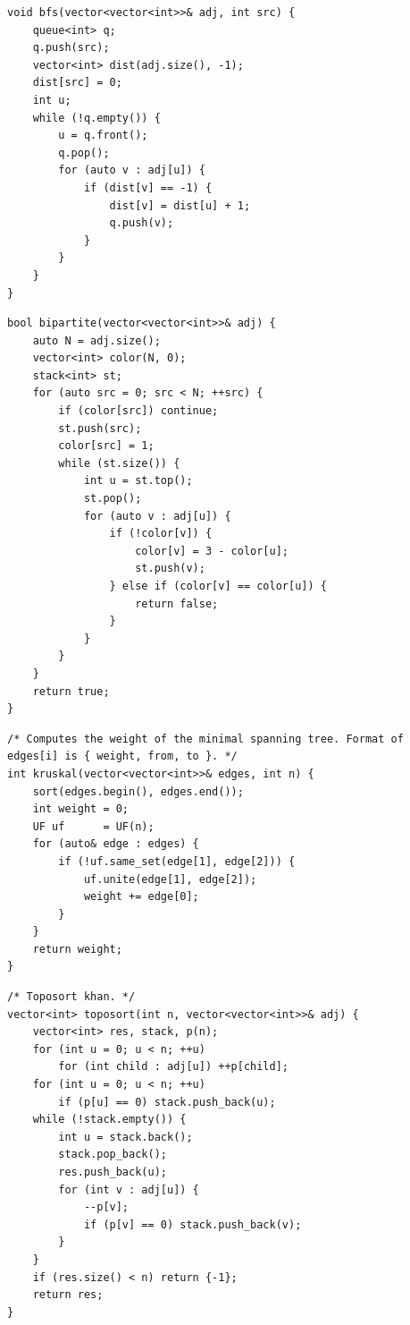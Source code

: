 \documentclass[a4paper,10pt]{article}
\newenvironment{keepfunction}{\begin{samepage}}{\end{samepage}}
\begin{document}
\begin{keepfunction}
\begin{verbatim}
void bfs(vector<vector<int>>& adj, int src) {
    queue<int> q;
    q.push(src);
    vector<int> dist(adj.size(), -1);
    dist[src] = 0;
    int u;
    while (!q.empty()) {
        u = q.front();
        q.pop();
        for (auto v : adj[u]) {
            if (dist[v] == -1) {
                dist[v] = dist[u] + 1;
                q.push(v);
            }
        }
    }
}
\end{verbatim}
\end{keepfunction}

\begin{keepfunction}
\begin{verbatim}
bool bipartite(vector<vector<int>>& adj) {
    auto N = adj.size();
    vector<int> color(N, 0);
    stack<int> st;
    for (auto src = 0; src < N; ++src) {
        if (color[src]) continue;
        st.push(src);
        color[src] = 1;
        while (st.size()) {
            int u = st.top();
            st.pop();
            for (auto v : adj[u]) {
                if (!color[v]) {
                    color[v] = 3 - color[u];
                    st.push(v);
                } else if (color[v] == color[u]) {
                    return false;
                }
            }
        }
    }
    return true;
}
\end{verbatim}
\end{keepfunction}

\begin{keepfunction}
\begin{verbatim}
/* Computes the weight of the minimal spanning tree. Format of edges[i] is { weight, from, to }. */
int kruskal(vector<vector<int>>& edges, int n) {
    sort(edges.begin(), edges.end());
    int weight = 0;
    UF uf      = UF(n);
    for (auto& edge : edges) {
        if (!uf.same_set(edge[1], edge[2])) {
            uf.unite(edge[1], edge[2]);
            weight += edge[0];
        }
    }
    return weight;
}
\end{verbatim}
\end{keepfunction}

\begin{keepfunction}
\begin{verbatim}
/* Toposort khan. */
vector<int> toposort(int n, vector<vector<int>>& adj) {
    vector<int> res, stack, p(n);
    for (int u = 0; u < n; ++u)
        for (int child : adj[u]) ++p[child];
    for (int u = 0; u < n; ++u)
        if (p[u] == 0) stack.push_back(u);
    while (!stack.empty()) {
        int u = stack.back();
        stack.pop_back();
        res.push_back(u);
        for (int v : adj[u]) {
            --p[v];
            if (p[v] == 0) stack.push_back(v);
        }
    }
    if (res.size() < n) return {-1};
    return res;
}
\end{verbatim}
\end{keepfunction}
\end{document}

